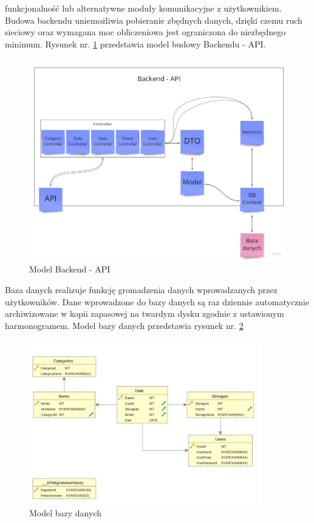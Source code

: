 \documentclass[12pt,a4paper]{article}
\begin{document}
			funkcjonalność lub alternatywne moduły komunikacyjne z użytkownikiem. Budowa backendu uniemożliwia pobieranie zbędnych danych, dzięki czemu ruch sieciowy oraz wymagana moc
			obliczeniowa jest ograniczona do niezbędnego minimum. Rysunek nr. \ref{fig:api_model} przedstawia model budowy Backendu - API.\\
		\begin{figure}[h]
			\centering
			\includegraphics[width=\textwidth]{img/Backend-API_model.jpg}
			\caption{Model Backend - API}
			\label{fig:api_model}
		\end{figure}
		\indent Baza danych realizuje funkcję gromadzenia danych wprowadzanych przez użytkowników. Dane wprowadzone do bazy danych są raz dziennie automatycznie archiwizowane
			w kopii zapasowej na twardym dysku zgodnie z ustawionym harmonogramem. Model bazy danych przedstawia rysunek nr. \ref{fig:db_model}\\
		\begin{figure}[H]
			\centering
			\includegraphics[width=0.9\textwidth]{img/model_bazy_danych.jpg}
			\caption{Model bazy danych}
		\label{fig:db_model}
		\end{figure}
\end{document}
